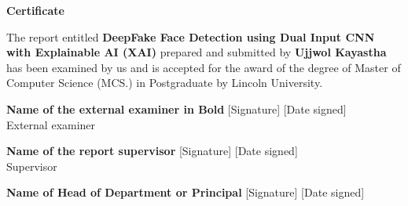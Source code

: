 \pagestyle{plain}
\vspace*{52pt}
\begin{center}
    \large{\textbf{Certificate}}\\[31pt]
\end{center}

The report entitled \textbf{DeepFake Face Detection using  Dual Input CNN with Explainable AI (XAI)} prepared and submitted by \textbf{Ujjwol Kayastha} has been examined by us and is accepted for the award of the degree of Master of Computer Science (MCS.) in Postgraduate by Lincoln University.


\vspace{73pt}

\noindent
\textbf{Name of the external examiner in Bold} \hfill [Signature] \hfill [Date signed] \\
External examiner

\vspace{2cm}

\noindent
\textbf{Name of the report supervisor} \hfill [Signature] \hfill [Date signed] \\
Supervisor

\vspace{2cm}

\noindent
\textbf{Name of Head of Department or Principal} \hfill [Signature] \hfill [Date signed]

